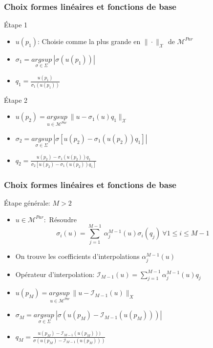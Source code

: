 \documentclass[a4paper,10pt]{beamer}
\numberwithin{equation}{section}
\begin{document}
\begin{frame}
\frametitle{\sc Choix formes linéaires et fonctions de base }
\begin{block}{\sc Étape 1}
	\begin{itemize}
		\item $u(p_{1})$: Choisie comme la plus grande en $\| \cdot\|_{\mathcal{X}}$ de $\mathcal{M}^{Par}$
		\item $\sigma_{1}=\underset{\sigma \in \Sigma}{argsup}\ |\sigma(u(p_{1}))|$
		\item $q_{1}=\frac{u(p_{1})}{\sigma_{1}(u(p_{1}))}$
	\end{itemize}
\end{block}
\begin{block}{\sc Étape 2}
	\begin{itemize}
		\item $u(p_{2})=\underset{u\in \mathcal{M}^{Par}}{argsup}\ \| u-\sigma_{1}(u)q_{1}\|_{\mathcal{X}}$
		\item $\sigma_{2}=\underset{\sigma \in \Sigma}{argsup}\ |\sigma[u(p_{2})-\sigma_{1}(u(p_{2}))q_{1}]|$
		\item $q_{2}=\frac{u(p_{2})-\sigma_{1}(u(p_{2}))q_{1}}{\sigma_{2}[u(p_{2})-\sigma_{1}(u(p_{2}))q_{1}]}$
	\end{itemize}
\end{block}
\end{frame}
\begin{frame}
\frametitle{\sc Choix formes linéaires et fonctions de base }
\begin{block}{\sc Étape générale: $M>2$}
	\begin{itemize}
		\item $u \in \mathcal{M}^{Par}:$  Résoudre$$\sigma_{i}(u)=\sum_{j=1}^{M-1}\ \alpha_{j}^{M-1}(u)\sigma_{i}(q_{j})\ \forall 1\leq i\leq M-1$$
		\item On trouve les coefficients d'interpolations $\alpha_{j}^{M-1}(u)$
		\item Opérateur d'interpolation: $\mathcal{I}_{M-1}(u)=\sum_{j=1}^{M-1}\alpha_{j}^{M-1}(u)q_{j}$
		\item $u(p_{M})=\underset{u\in \mathcal{M}^{Par}}{argsup\ }\| u-\mathcal{I}_{M-1}(u)\|_{X}$
		\item $\sigma_{M}=\underset{\sigma \in \Sigma}{argsup\ }|\sigma(u(p_{M})-\mathcal{I}_{M-1}(u(p_{M})) ) |$
		\item $ q_{M}=\frac{u(p_{M})-\mathcal{I}_{M-1}(u(p_{M}))) }{\sigma(u(p_{M})-\mathcal{I}_{M-1}(u(p_{M}) ))}$
	\end{itemize}
	
\end{block}
\end{frame}
\end{document}
